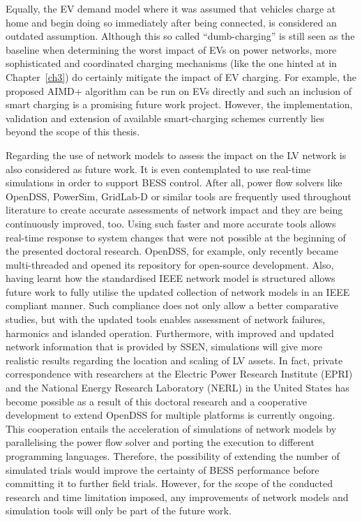 Equally, the EV demand model where it was assumed that vehicles charge at home and begin doing so immediately after being connected, is considered an outdated assumption.
Although this so called ``dumb-charging'' is still seen as the baseline when determining the worst impact of EVs on power networks, more sophisticated and coordinated charging mechanisms (like the one hinted at in Chapter~\ref{ch3}) do certainly mitigate the impact of EV charging.
For example, the proposed AIMD+ algorithm can be run on EVs directly and such an inclusion of smart charging is a promising future work project.
However, the implementation, validation and extension of available smart-charging schemes currently lies beyond the scope of this thesis.

Regarding the use of network models to assess the impact on the LV network is also considered as future work.
It is even contemplated to use real-time simulations in order to support BESS control.
After all, power flow solvers like OpenDSS, PowerSim, GridLab-D or similar tools are frequently used throughout literature to create accurate assessments of network impact and they are being continuously improved, too.
Using such faster and more accurate tools allows real-time response to system changes that were not possible at the beginning of the presented doctoral research.
OpenDSS, for example, only recently became multi-threaded and opened its repository for open-source development.
Also, having learnt how the standardised IEEE network model is structured allows future work to fully utilise the updated collection of network models in an IEEE compliant manner.
Such compliance does not only allow a better comparative studies, but with the updated tools enables assessment of network failures, harmonics and islanded operation.
Furthermore, with improved and updated network information that is provided by SSEN, simulations will give more realistic results regarding the location and scaling of LV assets.
In fact, private correspondence with researchers at the Electric Power Research Institute (EPRI) and the National Energy Research Laboratory (NERL) in the United States has become possible as a result of this doctoral research and a cooperative development to extend OpenDSS for multiple platforms is currently ongoing.
This cooperation entails the acceleration of simulations of network models by parallelising the power flow solver and porting the execution to different programming languages.
Therefore, the possibility of extending the number of simulated trials would improve the certainty of BESS performance before committing it to further field trials.
However, for the scope of the conducted research and time limitation imposed, any improvements of network models and simulation tools will only be part of the future work.

